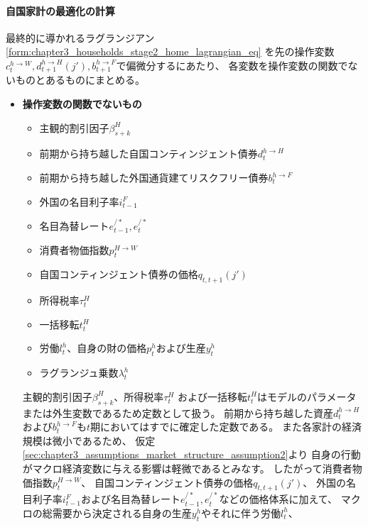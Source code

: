 \paragraph{自国家計の最適化の計算}
\label{sec:household_optimization_home_calculation}
最終的に導かれるラグランジアン
\eqref{form:chapter3_households_stage2_home_lagrangian_eq}
を先の操作変数\(c_t^{h\to W}, d_{t+1}^{h\to H}(j'), b_{t+1}^{h\to F}\)で偏微分するにあたり、
各変数を操作変数の関数でないものとあるものにまとめる。
\begin{itemize}
    \item
    \label{itm:household_optimization_home_calculation_remark1}
        \textbf{操作変数の関数でないもの}
        \begin{itemize}
            \item 主観的割引因子\(\beta_{s+k}^H\)
            \item 前期から持ち越した自国コンティンジェント債券\(d_t^{h\to H}\)
            \item 前期から持ち越した外国通貨建てリスクフリー債券\(b_t^{h\to F}\)
            \item 外国の名目利子率\(i_{t-1}^F\)
            \item 名目為替レート\(e_{t-1}^{/*}, e_t^{/*}\)
            \item 消費者物価指数\(p_t^{H\to W}\)
            \item 自国コンティンジェント債券の価格\(q_{t,t+1}(j')\)
            \item 所得税率\(\tau_t^H\)
            \item 一括移転\(t_t^H\)
            \item 労働\(l_t^h\)、自身の財の価格\(p_t^h\)および生産\(y_t^h\)
            \item ラグランジュ乗数\(\lambda_t^h\)
        \end{itemize}
        主観的割引因子\(\beta_{s+k}^H\)、所得税率\(\tau_t^H\)
        および一括移転\(t_t^H\)はモデルのパラメータまたは外生変数であるため定数として扱う。
        前期から持ち越した資産\(d_t^{h\to H}\)
        および\(b_t^{h\to F}\)も\(t\)期においてはすでに確定した定数である。
        また各家計の経済規模は微小であるため、
        仮定\eqref{sec:chapter3_assumptions_market_structure_assumption2}より
        自身の行動がマクロ経済変数に与える影響は軽微であるとみなす。
        したがって消費者物価指数\(p_t^{H\to W}\)、
        自国コンティンジェント債券の価格\(q_{t,t+1}(j')\)、
        外国の名目利子率\(i_{t-1}^F\)および名目為替レート\(e_{t-1}^{/*}, e_t^{/*}\)などの価格体系に加えて、
        マクロの総需要から決定される自身の生産\(y_t^h\)やそれに伴う労働\(l_t^h\)、

\end{itemize}
